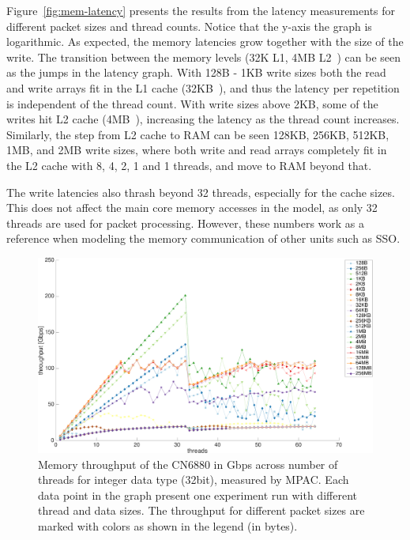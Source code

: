 Figure~\ref{fig:mem-latency} presents the results from the latency measurements for different packet sizes and thread counts. Notice that the y-axis the graph is logarithmic. As expected, the memory latencies grow together with the size of the write. The transition between the memory levels (32K L1, 4MB L2~\cite{cavium:2010:fundamentals}) can be seen as the jumps in the latency graph. With 128B - 1KB write sizes both the read and write arrays fit in the L1 cache (32KB~\cite{cavium:2010:fundamentals}), and thus the latency per repetition is independent of the thread count. With write sizes above 2KB, some of the writes hit L2 cache (4MB~\cite{cavium:2010:fundamentals}), increasing the latency as the thread count increases. Similarly, the step from L2 cache to RAM can be seen 128KB, 256KB, 512KB, 1MB, and 2MB write sizes, where both write and read arrays completely fit in the L2 cache with 8, 4, 2, 1 and 1 threads, and move to RAM beyond that.

The write latencies also thrash beyond 32 threads, especially for the cache sizes. This does not affect the main core memory accesses in the model, as only 32 threads are used for packet processing. However, these numbers work as a reference when modeling the memory communication of other units such as SSO.

\begin{figure}[]
  \begin{center}
    \includegraphics[width=\textwidth]{images/mem-throughput.pdf}
    \caption{Memory throughput of the CN6880 in Gbps across number of threads for integer data type (32bit), measured by MPAC. Each data point in the graph present one experiment run with different thread and data sizes. The throughput for different packet sizes are marked with colors as shown in the legend (in bytes).}
    \label{fig:mem-throughput}
  \end{center}
\end{figure}

